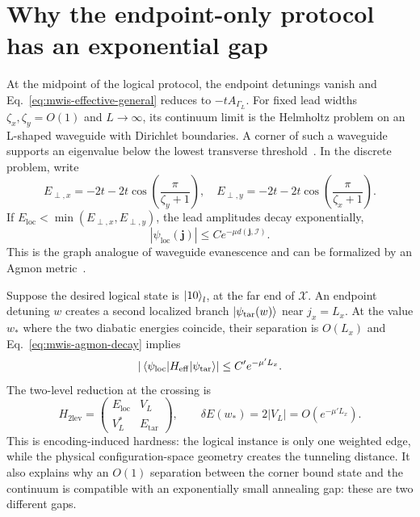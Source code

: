 \section{Why the endpoint-only protocol has an exponential gap}
\label{sec:mwis-localization-gap}

At the midpoint of the logical protocol, the endpoint detunings vanish and
Eq.~\eqref{eq:mwis-effective-general} reduces to $-tA_{\Gamma_L}$.  For fixed
lead widths $\zeta_x,\zeta_y=O(1)$ and $L\rightarrow\infty$, its continuum
limit is the Helmholtz problem on an L-shaped waveguide with Dirichlet
boundaries.  A corner of such a waveguide supports an eigenvalue below the
lowest transverse threshold~\cite{dauge2012quantum}.  In the discrete problem,
write
\begin{equation}
 E_{\perp,x}=-2t-2t\cos\!\left(\frac{\pi}{\zeta_y+1}\right),
 \quad
 E_{\perp,y}=-2t-2t\cos\!\left(\frac{\pi}{\zeta_x+1}\right).
 \label{eq:mwis-strip-thresholds}
\end{equation}
If $E_{\mathrm{loc}}<\min(E_{\perp,x},E_{\perp,y})$, the lead amplitudes
decay exponentially,
\begin{equation}
 |\psi_{\mathrm{loc}}(\mathbf j)|
 \leq C e^{-\mu d(\mathbf j,\mathcal I)} .
 \label{eq:mwis-agmon-decay}
\end{equation}
This is the graph analogue of waveguide evanescence and can be formalized by
an Agmon metric~\cite{steinerberger2022agmon}.

Suppose the desired logical state is $\ket{10}_l$, at the far end of
$\mathcal X$.  An endpoint detuning $w$ creates a second localized branch
$\ket{\psi_{\mathrm{tar}}(w)}$ near $j_x=L_x$.  At the value $w_*$ where the
two diabatic energies coincide, their separation is $O(L_x)$ and
Eq.~\eqref{eq:mwis-agmon-decay} implies
\begin{equation}
 \left|\matrixel{\psi_{\mathrm{loc}}}{H_{\mathrm{eff}}}
 {\psi_{\mathrm{tar}}}\right|
 \leq C' e^{-\mu' L_x}.
 \label{eq:mwis-exp-matrix-element}
\end{equation}
The two-level reduction at the crossing is
\begin{equation}
 H_{2\mathrm{lev}}=
 \begin{pmatrix}
 E_{\mathrm{loc}}&V_L\\
 V_L^*&E_{\mathrm{tar}}
 \end{pmatrix},
 \qquad
 \delta E(w_*)=2|V_L|=O(e^{-\mu' L_x}).
 \label{eq:mwis-two-level-crossing}
\end{equation}
This is encoding-induced hardness: the logical instance is only one weighted
edge, while the physical configuration-space geometry creates the tunneling
distance.  It also explains why an $O(1)$ separation between the corner bound
state and the continuum is compatible with an exponentially small annealing
gap: these are two different gaps.

